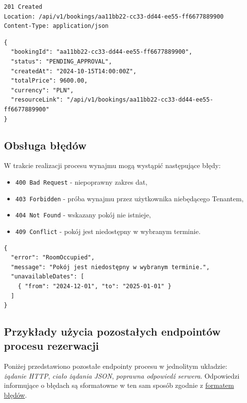 \documentclass[11pt, a4paper]{article}
\begin{document}
\begin{lstlisting}[style=http,caption={Odpowiedź HTTP — sukces}]
201 Created
Location: /api/v1/bookings/aa11bb22-cc33-dd44-ee55-ff6677889900
Content-Type: application/json
\end{lstlisting}

\begin{lstlisting}[style=json,caption={Ciało odpowiedzi — sukces}]
{
  "bookingId": "aa11bb22-cc33-dd44-ee55-ff6677889900",
  "status": "PENDING_APPROVAL",
  "createdAt": "2024-10-15T14:00:00Z",
  "totalPrice": 9600.00,
  "currency": "PLN",
  "resourceLink": "/api/v1/bookings/aa11bb22-cc33-dd44-ee55-ff6677889900"
}
\end{lstlisting}

\subsection{Obsługa błędów}

W trakcie realizacji procesu wynajmu mogą wystąpić następujące błędy:

\begin{itemize}
    \item \texttt{400 Bad Request} - niepoprawny zakres dat,
    \item \texttt{403 Forbidden} - próba wynajmu przez użytkownika niebędącego Tenantem,
    \item \texttt{404 Not Found} - wskazany pokój nie istnieje,
    \item \texttt{409 Conflict} - pokój jest niedostępny w wybranym terminie.
\end{itemize}

\begin{lstlisting}[style=json,caption={Przykładowa odpowiedź — pokój zajęty}]
{
  "error": "RoomOccupied",
  "message": "Pokój jest niedostępny w wybranym terminie.",
  "unavailableDates": [
    { "from": "2024-12-01", "to": "2025-01-01" }
  ]
}
\end{lstlisting}

\subsection{Przykłady użycia pozostałych endpointów procesu rezerwacji}

Poniżej przedstawiono pozostałe endpointy procesu w jednolitym układzie:
\textit{żądanie HTTP}, \textit{ciało żądania JSON}, \textit{poprawna odpowiedź serwera}.
Odpowiedzi informujące o błędach są sformatowne w ten sam sposób zgodnie z \hyperref[sec:CommonErrs]{formatem błędów}.
\end{document}
